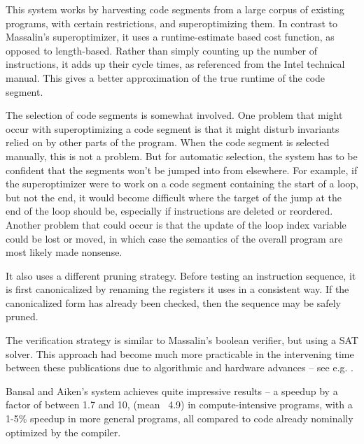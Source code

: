 \documentclass[12pt,twoside]{reedthesis}
\begin{document}
            This system works by harvesting code segments from a large corpus of existing programs, with certain restrictions, and superoptimizing them. 
            In contrast to Massalin's superoptimizer, it uses a runtime-estimate based cost function, as opposed to length-based.
            Rather than simply counting up the number of instructions, it adds up their cycle times, as referenced from the Intel technical manual.
            This gives a better approximation of the true runtime of the code segment.
            
            The selection of code segments is somewhat involved.
            One problem that might occur with superoptimizing a code segment is that it might disturb invariants relied on by other parts of the program.
            When the code segment is selected manually, this is not a problem.
            But for automatic selection, the system has to be confident that the segments won't be jumped into from elsewhere.
            For example, if the superoptimizer were to work on a code segment containing the start of a loop, but not the end, it would become difficult where the target of the jump at the end of the loop should be, especially if instructions are deleted or reordered.
            Another problem that could occur is that the update of the loop index variable could be lost or moved, in which case the semantics of the overall program are most likely made nonsense.
            
            It also uses a different pruning strategy.
            Before testing an instruction sequence, it is first canonicalized by renaming the registers it uses in a consistent way.
            If the canonicalized form has already been checked, then the sequence may be safely pruned.
            
            The verification strategy is similar to Massalin's boolean verifier, but using a SAT solver.
            This approach had become much more practicable in the intervening time between these publications due to algorithmic and hardware advances -- see e.g. \cite{silva1996grasp}.
            
            Bansal and Aiken's system achieves quite impressive results -- a speedup by a factor of between 1.7 and 10, (mean ~4.9) in compute-intensive programs, with a 1-5\% speedup in more general programs, all compared to code already nominally optimized by the compiler.
\end{document}
